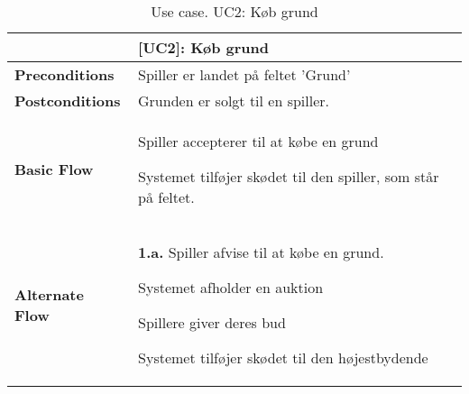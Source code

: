 \documentclass[class=article, crop=false]{standalone}
\begin{document}
        \begin{table}[H]
            \caption{Use case. UC2: Køb grund}
            \begin{tabularx}{\textwidth}{|l|X|}
                \hline
                & \textbf{[UC2]: Køb grund}   \\ \hline
                \textbf{Preconditions}       & Spiller er landet på feltet 'Grund'\\ \hline
                \textbf{Postconditions}      & Grunden er solgt til en spiller.\\ \hline


                \textbf{Basic Flow} & \begin{tabenum}
                                          \item Spiller accepterer til at købe en grund
                                          \item Systemet tilføjer skødet til den spiller, som står på feltet.
                \end{tabenum}   \\ \hline




                \textbf{Alternate Flow}   & \textbf{1.a.} Spiller afvise til at købe en grund.
                \begin{enumerate} \begin{tabenum}
                                      \item Systemet afholder en auktion
                                      \item Spillere giver deres bud
                                      \item Systemet tilføjer skødet til den højestbydende
                \end{tabenum} \end{enumerate}
                \\



                \hline

            \end{tabularx}


        \end{table}

    
\end{document}
